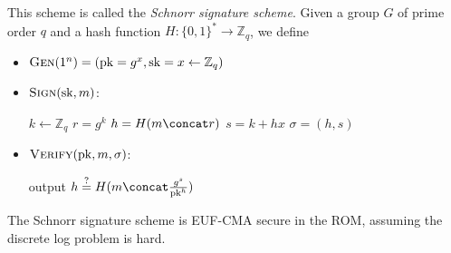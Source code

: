 \documentclass[12pt]{tufte-book}
\begin{document}
This scheme is called the \emph{Schnorr signature scheme}. Given a group $G$ of prime order $q$ and a hash function $H : \{0, 1\}^* \to \mathbb{Z}_q$, we define
\begin{itemize}
    \item $\textsc{Gen}(1^n) = (\mathrm{pk} = g^x, \mathrm{sk} = x \gets \mathbb{Z}_q)$
    \item $\textsc{Sign}(\mathrm{sk}, m)$:
        \begin{algorithmic}
            \State $k \gets \mathbb{Z}_q$
            \State $r = g^k$
            \State $h = H(m \concat r)$
            \State $s = k + hx$
            \State $\sigma = (h, s)$
        \end{algorithmic}

    \item $\textsc{Verify}(\mathrm{pk}, m, \sigma)$:
        \begin{algorithmic}
            \State output $h \overset{?}{=} H(m \concat \frac{g^s}{\mathrm{pk}^h})$
        \end{algorithmic}
\end{itemize}

\begin{theorem}
    The Schnorr signature scheme is EUF-CMA secure in the ROM, assuming the discrete log problem is hard.
\end{theorem}
\end{document}
